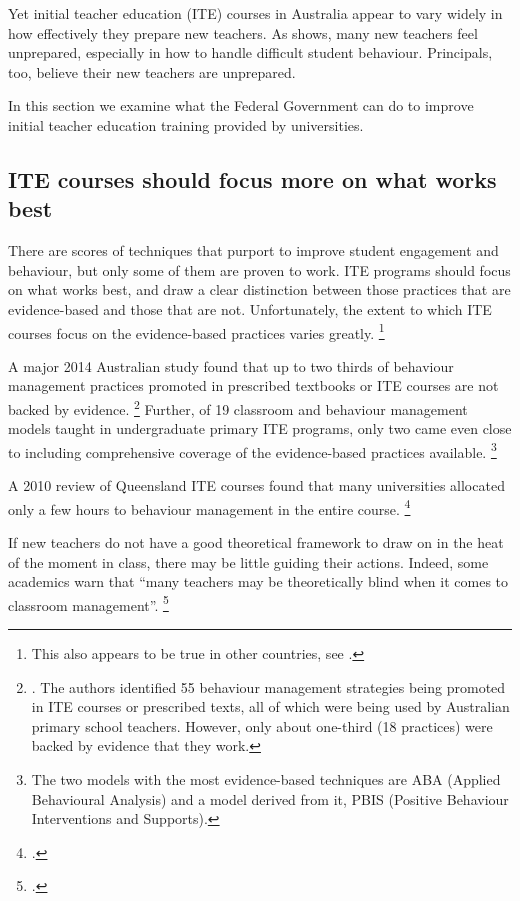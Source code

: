 \documentclass{grattan}
\begin{document}
Yet initial teacher education (ITE) courses in Australia appear to vary widely in how effectively they prepare new teachers. As  shows, many new teachers feel unprepared, especially in how to handle difficult student behaviour. Principals, too, believe their new teachers are unprepared.

In this section we examine what the Federal Government can do to improve initial teacher education training provided by universities.

\subsection{ITE courses should focus more on what works best}\label{subsec:ITE-focus-more-on-theory}
There are scores of techniques that purport to improve student engagement and behaviour, but only some of them are proven to work. ITE programs should focus on what works best, and draw a clear distinction between those practices that are evidence-based and those that are not. Unfortunately, the extent to which ITE courses focus on the evidence-based practices varies greatly.%
    \footnote{This also appears to be true in other countries, see \textcite{Greenberg2014TrainingOurFuture}.}

A major 2014 Australian study found that up to two thirds of behaviour management practices promoted in prescribed textbooks or ITE courses are not backed by evidence.%
    \footnote{\textcite{ONeillStephenson2014EvidenceBasedClassroom}. The authors identified 55 behaviour management strategies being promoted in ITE courses or prescribed texts, all of which were being used by Australian primary school teachers. However, only about one-third (18 practices) were backed by evidence that they work.}
Further, of 19 classroom and behaviour management models taught in undergraduate primary ITE programs, only two came even close to including comprehensive coverage of the evidence-based practices available.%
    \footnote{\textcite{ONeillStephenson2014EvidenceBasedClassroom}The two models with the most evidence-based techniques are ABA (Applied Behavioural Analysis) and a model derived from it, PBIS (Positive Behaviour Interventions and Supports).}

A 2010 review of Queensland ITE courses found that many universities allocated only a few hours to behaviour management in the entire course.%
    \footcite[][12]{Caldwell2010ReviewTeacherEducation}

If new teachers do not have a good theoretical framework to draw on in the heat of the moment in class, there may be little guiding their actions. Indeed, some academics warn that ``many teachers may be theoretically blind when it comes to classroom management''.%
    \footcite{RileyBrew2010WhyDidYouDoThat}
\end{document}
